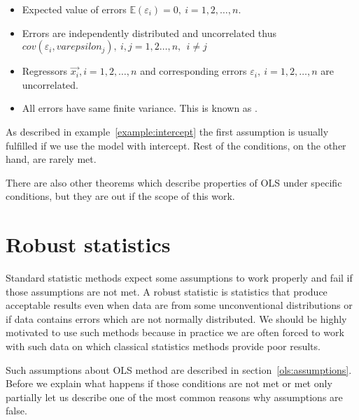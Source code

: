 \begin{itemize} \label{ols:assumptions}
  \item Expected value of errors $\mathbb{E}(\varepsilon_i) = 0, \ i = 1,2, \ldots , n$.
  \item Errors are independently distributed and uncorrelated thus \\ $cov(\varepsilon_i, varepsilon_j), \ i, j = 1, 2 \ldots , n, \ \ i \neq j$
  \item Regressors $\vec{x_i}, i = 1, 2, \ldots , n$ and corresponding errors 
$\varepsilon_i, \ i = 1,2, \ldots , n$ are uncorrelated.
 \item All errors have same finite variance. This is known as .
\end{itemize}

\begin{note}
 As described in example~\ref{example:intercept} the first assumption is usually fulfilled if we use the model with intercept. Rest of the conditions, on the other hand, are rarely met.
\end{note}

There are also other theorems which describe properties of OLS under specific conditions, but they are out if the scope of this work.



\section{Robust statistics} \label{section:roboust}
Standard statistic methods expect some assumptions to work properly and fail if those assumptions are not met. A robust statistic is statistics that produce acceptable results even when data are from some unconventional distributions or if data contains errors which are not normally distributed. We should be highly motivated to use such methods because in practice we are often forced to work with such data on which classical statistics methods provide poor results.

Such assumptions about OLS method are described in section~\ref{ols:assumptions}. Before we explain what happens if those conditions are not met or met only partially let us describe one of the most common reasons why assumptions are false.

